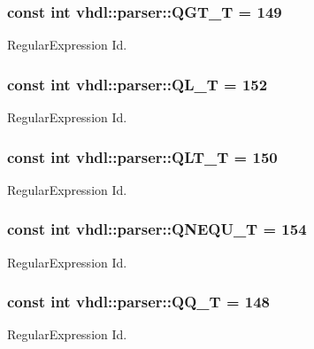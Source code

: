 \subsubsection[{Q\+G\+T\+\_\+\+T}]{\setlength{\rightskip}{0pt plus 5cm}const int vhdl\+::parser\+::\+Q\+G\+T\+\_\+\+T = 149}\label{namespacevhdl_1_1parser_a8c898e44cc375fd8ef3af04fcc65e0dd}
Regular\+Expression Id. \hypertarget{namespacevhdl_1_1parser_ad1806f032fdae81d11d1b903d0f52ad5}{}
\subsubsection[{Q\+L\+\_\+\+T}]{\setlength{\rightskip}{0pt plus 5cm}const int vhdl\+::parser\+::\+Q\+L\+\_\+\+T = 152}\label{namespacevhdl_1_1parser_ad1806f032fdae81d11d1b903d0f52ad5}
Regular\+Expression Id. \hypertarget{namespacevhdl_1_1parser_a0fe91f5fe6b1ffc59dc84ddaa3bc7182}{}
\subsubsection[{Q\+L\+T\+\_\+\+T}]{\setlength{\rightskip}{0pt plus 5cm}const int vhdl\+::parser\+::\+Q\+L\+T\+\_\+\+T = 150}\label{namespacevhdl_1_1parser_a0fe91f5fe6b1ffc59dc84ddaa3bc7182}
Regular\+Expression Id. \hypertarget{namespacevhdl_1_1parser_addcf553e2964cf30fd0501eeca252de8}{}
\subsubsection[{Q\+N\+E\+Q\+U\+\_\+\+T}]{\setlength{\rightskip}{0pt plus 5cm}const int vhdl\+::parser\+::\+Q\+N\+E\+Q\+U\+\_\+\+T = 154}\label{namespacevhdl_1_1parser_addcf553e2964cf30fd0501eeca252de8}
Regular\+Expression Id. \hypertarget{namespacevhdl_1_1parser_a9c3a9af7de2105f049a9ed3c9604d0f1}{}
\subsubsection[{Q\+Q\+\_\+\+T}]{\setlength{\rightskip}{0pt plus 5cm}const int vhdl\+::parser\+::\+Q\+Q\+\_\+\+T = 148}\label{namespacevhdl_1_1parser_a9c3a9af7de2105f049a9ed3c9604d0f1}
Regular\+Expression Id. \hypertarget{namespacevhdl_1_1parser_ae266e91656cd2dcaf9fd6eb304e2d69e}{}
